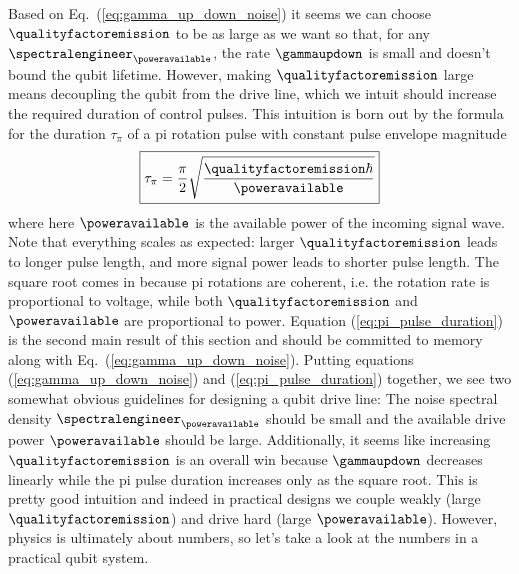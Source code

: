 Based on Eq.~(\ref{eq:gamma_up_down_noise}) it seems we can choose $\qualityfactoremission$ to be as large as we want so that, for any $\spectralengineer_{\poweravailable}$, the rate $\gammaupdown$ is small and doesn't bound the qubit lifetime.
However, making $\qualityfactoremission$ large means decoupling the qubit from the drive line, which we intuit should increase the required duration of control pulses.
This intuition is born out by the formula for the duration $\tau_\pi$ of a pi rotation pulse with constant pulse envelope magnitude \cite{Sank:qubits101:2012}
\begin{equation}
  \boxed{
    \tau_\pi = \frac{\pi}{2} \sqrt{\frac{\qualityfactoremission \hbar}{\poweravailable}} \label{eq:pi_pulse_duration}
  }
\end{equation}
where here $\poweravailable$ is the available power of the incoming signal wave.
Note that everything scales as expected: larger $\qualityfactoremission$ leads to longer pulse length, and more signal power leads to shorter pulse length.
The square root comes in because pi rotations are coherent, i.e. the rotation rate is proportional to voltage, while both $\qualityfactoremission$ and $\poweravailable$ are proportional to power.
Equation (\ref{eq:pi_pulse_duration}) is the second main result of this section and should be committed to memory along with Eq.~(\ref{eq:gamma_up_down_noise}).
Putting equations (\ref{eq:gamma_up_down_noise}) and (\ref{eq:pi_pulse_duration}) together, we see two somewhat obvious guidelines for designing a qubit drive line: The noise spectral density $\spectralengineer_{\poweravailable}$ should be small and the available drive power $\poweravailable$ should be large.
Additionally, it seems like increasing $\qualityfactoremission$ is an overall win because $\gammaupdown$ decreases linearly while the pi pulse duration increases only as the square root.
This is pretty good intuition and indeed in practical designs we couple weakly (large $\qualityfactoremission$) and drive hard (large $\poweravailable$).
However, physics is ultimately about numbers, so let's take a look at the numbers in a practical qubit system.



